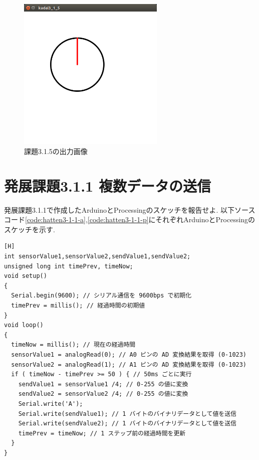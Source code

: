 \documentclass{jarticle}
\begin{document}
\begin{figure}[H]
\begin{center}
\includegraphics[width=7.0cm]{images/kadai3-1-5.png}
\caption{課題3.1.5の出力画像}
\label{fig:kadai3-1-5}
\end{center}
\end{figure}


\section{発展課題3.1.1 複数データの送信}
発展課題3.1.1で作成したArduinoとProcessingのスケッチを報告せよ.
以下ソースコード\ref{code:hatten3-1-1-a},\ref{code:hatten3-1-1-p}にそれぞれArduinoとProcessingのスケッチを示す.

\begin{lstlisting}[caption = 発展課題3.1.1(Arduino),label=code:hatten3-1-1-a][H]
int sensorValue1,sensorValue2,sendValue1,sendValue2;
unsigned long int timePrev, timeNow;
void setup()
{
  Serial.begin(9600); // シリアル通信を 9600bps で初期化
  timePrev = millis(); // 経過時間の初期値
}
void loop()
{
  timeNow = millis(); // 現在の経過時間
  sensorValue1 = analogRead(0); // A0 ピンの AD 変換結果を取得 (0-1023)
  sensorValue2 = analogRead(1); // A1 ピンの AD 変換結果を取得 (0-1023)
  if ( timeNow - timePrev >= 50 ) { // 50ms ごとに実行
    sendValue1 = sensorValue1 /4; // 0-255 の値に変換
    sendValue2 = sensorValue2 /4; // 0-255 の値に変換
    Serial.write('A');
    Serial.write(sendValue1); // 1 バイトのバイナリデータとして値を送信
    Serial.write(sendValue2); // 1 バイトのバイナリデータとして値を送信
    timePrev = timeNow; // 1 ステップ前の経過時間を更新
  }
}
\end{lstlisting}
\end{document}
